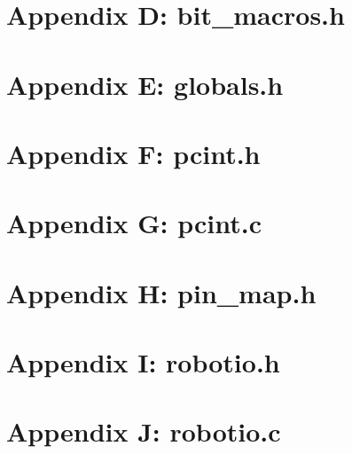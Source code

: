 \documentclass[letterpaper,11pt]{texMemo} %
\begin{document}
\section*{Appendix D: bit\_macros.h}
\begin{tiny}

\end{tiny}
\newpage

\section*{Appendix E: globals.h}
\begin{tiny}

\end{tiny}
\newpage

\section*{Appendix F: pcint.h}
\begin{tiny}

\end{tiny}
\newpage

\section*{Appendix G: pcint.c}
\begin{tiny}

\end{tiny}
\newpage

\section*{Appendix H: pin\_map.h}
\begin{tiny}

\end{tiny}
\newpage

\section*{Appendix I: robotio.h}
\begin{tiny}

\end{tiny}
\newpage

\section*{Appendix J: robotio.c}
\begin{tiny}

\end{tiny}
\newpage
\end{document}

